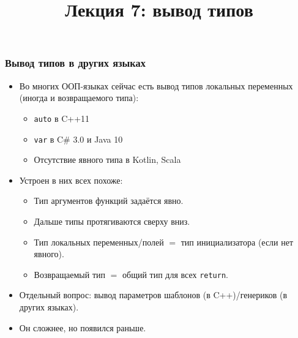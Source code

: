 \documentclass[11pt]{beamer}
\title{Лекция 7: вывод типов}
\begin{document}
\begin{frame}[plain]
  \maketitle
\end{frame}

\begin{frame}[fragile]
  \frametitle{Вывод типов в других языках}
  \begin{itemize}
    \item Во многих ООП-языках сейчас есть вывод типов локальных переменных (иногда и возвращаемого типа):
          \hspace{-1em}
          \pause
          \begin{itemize}
            \item \lstinline!auto! в C++11
            \item \lstinline!var! в C\# 3.0 и Java 10
            \item Отсутствие явного типа в Kotlin, Scala
          \end{itemize}
          \pause
    \item Устроен в них всех похоже:
          \begin{itemize}
            \pause
            \item Тип аргументов функций задаётся явно.
                  \pause
            \item Дальше типы протягиваются сверху вниз.
                  \pause
            \item Тип локальных переменных/полей $=$ тип инициализатора (если нет явного).
                  \pause
            \item Возвращаемый тип $=$ общий тип для всех \lstinline!return!.
          \end{itemize}
          \pause
    \item Отдельный вопрос: вывод параметров шаблонов (в C++)/генериков (в других языках).
          \pause
    \item Он сложнее, но появился раньше.
  \end{itemize}
\end{frame}
\end{document}
